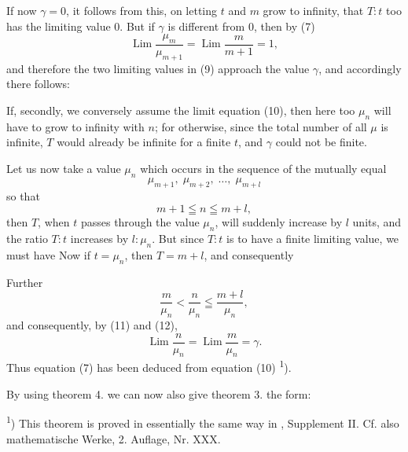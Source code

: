 If now $\gamma = 0$, it follows from this, on letting $t$ and $m$ grow to infinity, that $T : t$ too has the limiting value 0. But if $\gamma$ is different from 0, then by (7)
\[
\operatorname{Lim} \frac{\mu_m}{\mu_{m+1}} = \operatorname{Lim} \frac{m}{m+1} = 1,
\]
and therefore the two limiting values in (9) approach the value $\gamma$, and accordingly there follows:

If, secondly, we conversely assume the limit equation (10), then here too $\mu_n$ will have to grow to infinity with $n$; for otherwise, since the total number of all $\mu$ is infinite, $T$ would already be infinite for a finite $t$, and $\gamma$ could not be finite.

Let us now take a value $\mu_n$ which occurs in the sequence of the mutually equal
\[
\mu_{m+1}, \; \mu_{m+2}, \; \dots, \; \mu_{m+l}
\]
so that
\[
m + 1 \leqq n \leqq m + l,
\]
then $T$, when $t$ passes through the value $\mu_n$, will suddenly increase by $l$ units, and the ratio $T : t$ increases by $l : \mu_n$. But since $T : t$ is to have a finite limiting value, we must have
Now if $t = \mu_n$, then $T = m + l$, and consequently

Further
\[
\frac{m}{\mu_n} < \frac{n}{\mu_n} \leqq \frac{m+l}{\mu_n},
\]
and consequently, by (11) and (12),
\[
\operatorname{Lim} \frac{n}{\mu_n} = \operatorname{Lim} \frac{m}{\mu_n} = \gamma.
\]
Thus equation (7) has been deduced from equation (10) \textsuperscript{1}).

By using theorem 4. we can now also give theorem 3. the form:

\begingroup
\footnotesize
\textsuperscript{1}) This theorem is proved in essentially the same way in , Supplement II. Cf. also  mathematische Werke, 2. Auflage, Nr. XXX.
\endgroup
